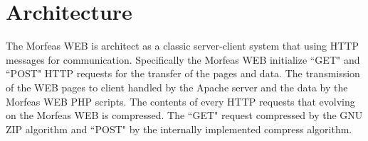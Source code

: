 \section{Architecture}
The Morfeas WEB is architect as a classic server-client system that using HTTP messages for communication. Specifically the Morfeas WEB initialize ``GET" and ``POST" HTTP requests
for the transfer of the pages and data. The transmission of the WEB pages to client handled by the Apache server and the data by the Morfeas WEB PHP scripts. 
The contents of every HTTP requests that evolving on the Morfeas WEB is compressed. The ``GET" request compressed by the GNU ZIP algorithm and ``POST" by the internally implemented compress algorithm.





